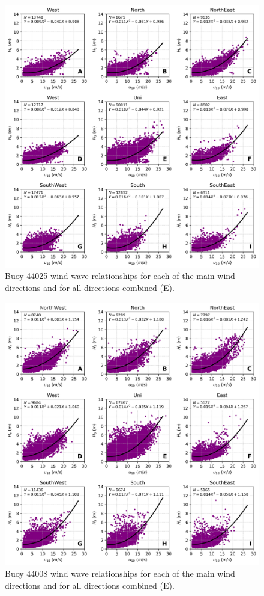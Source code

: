 \begin{figure}[H]
\centering
\includegraphics[width=0.95\linewidth]{Figures/Chapter5/b44025_wind_wave.png}
\caption{Buoy 44025 wind wave relationships for each of the main wind directions and for all directions combined (E).}
\label{fig:wind_wave_44025}
\end{figure}


\begin{figure}[H]
\centering
\includegraphics[width=0.95\linewidth]{Figures/Chapter5/b44008_wind_wave.png}
\caption{Buoy 44008 wind wave relationships for each of the main wind directions and for all directions combined (E).}
\label{fig:wind_wave_44008}
\end{figure}


